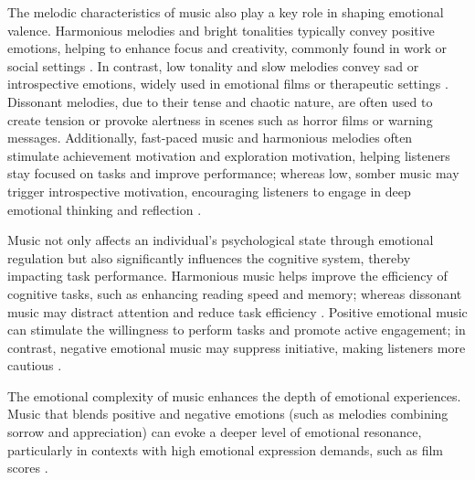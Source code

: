 The melodic characteristics of music also play a key role in shaping emotional valence. Harmonious melodies and bright tonalities typically convey positive emotions, helping to enhance focus and creativity, commonly found in work or social settings \cite{hofbauer2024background}. In contrast, low tonality and slow melodies convey sad or introspective emotions, widely used in emotional films or therapeutic settings \cite{kabre2024predisposed}. Dissonant melodies, due to their tense and chaotic nature, are often used to create tension or provoke alertness in scenes such as horror films or warning messages. Additionally, fast-paced music and harmonious melodies often stimulate achievement motivation and exploration motivation, helping listeners stay focused on tasks and improve performance; whereas low, somber music may trigger introspective motivation, encouraging listeners to engage in deep emotional thinking and reflection \cite{juslin2008emotional}.

Music not only affects an individual's psychological state through emotional regulation but also significantly influences the cognitive system, thereby impacting task performance. Harmonious music helps improve the efficiency of cognitive tasks, such as enhancing reading speed and memory; whereas dissonant music may distract attention and reduce task efficiency \cite{zajonc1980feeling}. Positive emotional music can stimulate the willingness to perform tasks and promote active engagement; in contrast, negative emotional music may suppress initiative, making listeners more cautious \cite{hofbauer2024background}.

The emotional complexity of music enhances the depth of emotional experiences. Music that blends positive and negative emotions (such as melodies combining sorrow and appreciation) can evoke a deeper level of emotional resonance, particularly in contexts with high emotional expression demands, such as film scores \cite{baltazaremotional}.


